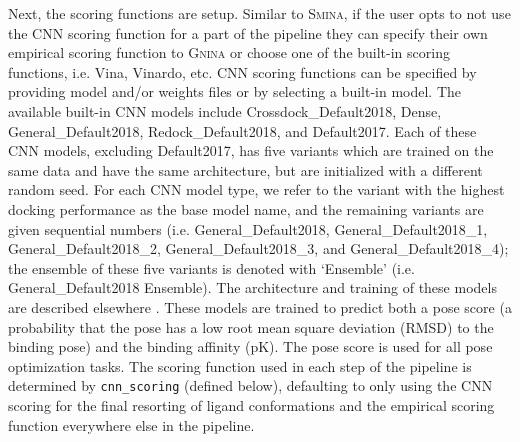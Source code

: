 \documentclass[journal=jcisd8,manuscript=article]{achemso}
\begin{document}
Next, the scoring functions are setup. Similar to \textsc{Smina}, if the user opts to not use the CNN scoring function for a part of the pipeline they can specify their own empirical scoring function to \textsc{Gnina} or choose one of the built-in scoring functions, i.e. Vina, Vinardo\cite{quiroga2016vinardo}, etc. CNN scoring functions can be specified by providing model and/or weights files or by selecting a built-in model.  The available built-in CNN models include Crossdock\_Default2018, Dense, General\_Default2018, Redock\_Default2018, and Default2017. Each of these CNN models, excluding Default2017, has five variants which are trained on the same data and have the same architecture, but are initialized with a different random seed. For each CNN model type, we refer to the variant with the highest docking performance as the base model name, and the remaining variants are given sequential numbers (i.e. General\_Default2018, General\_Default2018\_1, General\_Default2018\_2, General\_Default2018\_3, and General\_Default2018\_4); the ensemble of these five variants is denoted with `Ensemble' (i.e. General\_Default2018 Ensemble). The architecture and training of these models are described elsewhere \cite{francoeur2020three,Ragoza2017}. These models are trained to predict both a pose score (a probability that the pose has a low root mean square deviation (RMSD) to the binding pose) and the binding affinity (pK). The pose score is used for all pose optimization tasks. The scoring function used in each step of the pipeline is determined by \texttt{cnn\_scoring} (defined below), defaulting to only using the CNN scoring for the final resorting of ligand conformations and the empirical scoring function everywhere else in the pipeline. 
\end{document}
